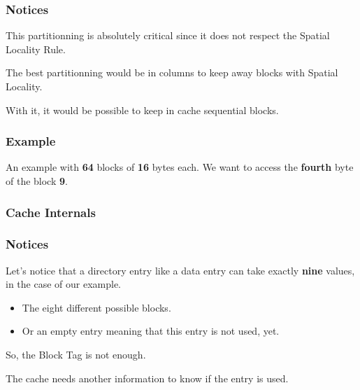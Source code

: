 \begin{frame}
  \frametitle{Notices}

  This partitionning is absolutely critical since it does not respect
  the Spatial Locality Rule.

  \nl

  The best partitionning would be in columns to keep away blocks with
  Spatial Locality.

  \nl

  With it, it would be possible to keep in cache sequential blocks.
\end{frame}


\begin{frame}
  \frametitle{Example}

  An example with \textbf{64} blocks of \textbf{16} bytes each. We want
  to access the \textbf{fourth} byte of the block \textbf{9}.

  \begin{center}
  \end{center}
\end{frame}


\begin{frame}
  \frametitle{Cache Internals}

  \begin{center}
  \end{center}
\end{frame}


\begin{frame}
  \frametitle{Notices}

  Let's notice that a directory entry like a data entry can take exactly
  \textbf{nine} values, in the case of our example.

  \begin{itemize}[<+->]
    \item
      The eight different possible blocks.
    \item
      Or an empty entry meaning that this entry is not used, yet.
  \end{itemize}

  So, the Block Tag is not enough.

  \nl

  The cache needs another information to know if the entry is used.
\end{frame}

